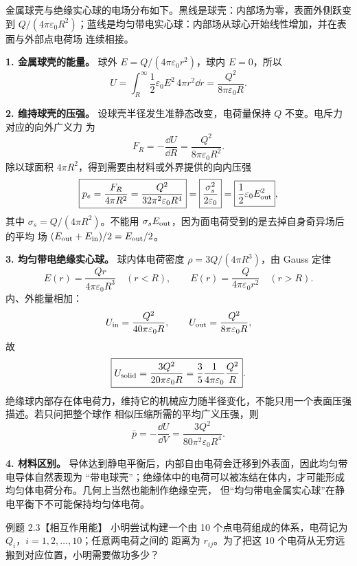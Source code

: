 \begin{xesolution}
金属球壳与绝缘实心球的电场分布如下。黑线是球壳：内部场为零，表面外侧跃变到
$Q/(4\pi\varepsilon_0R^2)$；蓝线是均匀带电实心球：内部场从球心开始线性增加，并在表面与外部点电荷场
连续相接。

\chargedSphereEnergyFigure

\textbf{1. 金属球壳的能量。} 球外
$E=Q/(4\pi\varepsilon_0r^2)$，球内 $E=0$，所以
\[
  U=\int_R^\infty\frac12\varepsilon_0E^2\,4\pi r^2\dd r
  =\boxed{\frac{Q^2}{8\pi\varepsilon_0R}}.
\]

\textbf{2. 维持球壳的压强。} 设球壳半径发生准静态改变，电荷量保持 $Q$ 不变。电斥力对应的向外广义力
为
\[
  F_R=-\frac{\dd U}{\dd R}
  =\frac{Q^2}{8\pi\varepsilon_0R^2}.
\]
除以球面积 $4\pi R^2$，得到需要由材料或外界提供的向内压强
\[
  \boxed{p_e=\frac{F_R}{4\pi R^2}
  =\frac{Q^2}{32\pi^2\varepsilon_0R^4}}
  =\boxed{\frac{\sigma_s^2}{2\varepsilon_0}}
  =\boxed{\frac12\varepsilon_0E_{\rm out}^2},
\]
其中 $\sigma_s=Q/(4\pi R^2)$。不能用 $\sigma_sE_{\rm out}$，因为面电荷受到的是去掉自身奇异场后的平均
场 $(E_{\rm out}+E_{\rm in})/2=E_{\rm out}/2$。

\textbf{3. 均匀带电绝缘实心球。} 球内体电荷密度
$\rho=3Q/(4\pi R^3)$，由 Gauss 定律
\[
  E(r)=\frac{Qr}{4\pi\varepsilon_0R^3}\quad(r<R),
  \qquad
  E(r)=\frac{Q}{4\pi\varepsilon_0r^2}\quad(r>R).
\]
内、外能量相加：
\[
  U_{\rm in}=\frac{Q^2}{40\pi\varepsilon_0R},
  \qquad U_{\rm out}=\frac{Q^2}{8\pi\varepsilon_0R},
\]
故
\[
  \boxed{U_{\rm solid}=\frac{3Q^2}{20\pi\varepsilon_0R}
  =\frac35\frac{1}{4\pi\varepsilon_0}\frac{Q^2}{R}}.
\]
绝缘球内部存在体电荷力，维持它的机械应力随半径变化，不能只用一个表面压强描述。若只问把整个球作
相似压缩所需的平均广义压强，则
\[
  \bar p=-\frac{\dd U}{\dd V}
  =\frac{3Q^2}{80\pi^2\varepsilon_0R^4}.
\]

\textbf{4. 材料区别。} 导体达到静电平衡后，内部自由电荷会迁移到外表面，因此均匀带电导体自然表现为
“带电球壳”；绝缘体中的电荷可以被冻结在体内，才可能形成均匀体电荷分布。几何上当然也能制作绝缘空壳，
但“均匀带电金属实心球”在静电平衡下不可能保持均匀体电荷。
\end{xesolution}

\begin{origexamplebox}{例题 2.3【相互作用能】}
小明尝试构建一个由 10 个点电荷组成的体系，电荷记为 $Q_i$，$i=1,2,\ldots,10$；任意两电荷之间的
距离为 $r_{ij}$。为了把这 10 个电荷从无穷远搬到对应位置，小明需要做功多少？
\end{origexamplebox}

